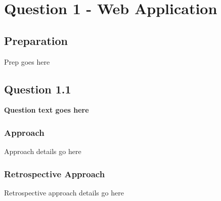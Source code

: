 \chapter{Question 1 - Web Application}

\section{Preparation}
Prep goes here

\section{Question 1.1}
\textbf{Question text goes here}
\subsection{Approach}
Approach details go here
\subsection{Retrospective Approach}
Retrospective approach details go here
